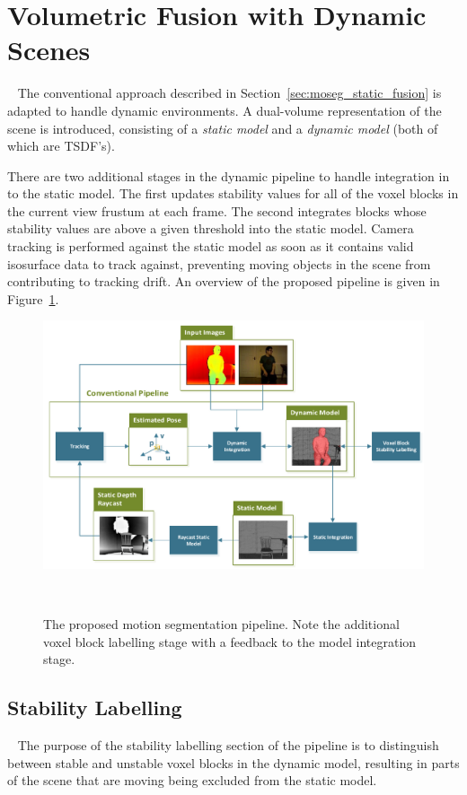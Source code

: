 \section{Volumetric Fusion with Dynamic Scenes}
~\label{sec:moseg_dynamic_fusion}
The conventional approach described in Section~\ref{sec:moseg_static_fusion} is adapted to handle dynamic 
environments. A dual-volume representation of the scene is introduced, consisting of a \emph{static model}
and a \emph{dynamic model} (both of which are TSDF's).

There are two additional stages in the dynamic pipeline to handle integration in
to the static model. The first updates stability values for all of the voxel
blocks in the current view frustum at each frame. The second integrates blocks
whose stability values are above a given threshold into the static model.
Camera tracking is performed against the static model as soon as it contains
valid isosurface data to track against, preventing moving objects in the scene
from contributing to tracking drift. An overview of the proposed pipeline is 
given in Figure~\ref{figure:moseg_pipeline}.

\begin{landscape}
\begin{figure}[!htbp]
  \centering
  \includegraphics[width=.9\linewidth]{figures/moseg/pipeline.pdf}
  \caption[Motion Segmentation Pipeline]{The proposed motion segmentation pipeline. 
  Note the additional voxel block labelling stage with a feedback to the model 
  integration stage.}
~\label{figure:moseg_pipeline}
\end{figure}
\end{landscape}

\subsection{Stability Labelling}
~\label{sub:moseg_stability_labelling}
The purpose of the stability labelling section of the pipeline is to distinguish
between stable and unstable voxel blocks in the dynamic model, resulting in
parts of the scene that are moving being excluded from the static model.

